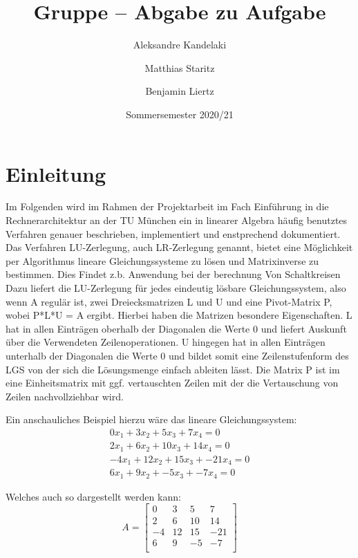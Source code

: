 \documentclass[course=erap]{aspdoc}
\author{⁨Aleksandre Kandelaki \and Matthias Staritz \and Benjamin Liertz}
\date{Sommersemester 2020/21} %
\title{Gruppe \theGroup{} -- Abgabe zu Aufgabe \theNumber}
\begin{document}
\maketitle

\section{Einleitung}


Im Folgenden wird im Rahmen der Projektarbeit im Fach Einführung
in die Rechnerarchitektur an der TU München ein in linearer Algebra häufig 
benutztes Verfahren genauer beschrieben, implementiert und enstprechend dokumentiert.\\

\noindent\hspace*{15mm}%
Das Verfahren LU-Zerlegung, auch LR-Zerlegung genannt,
 bietet eine Möglichkeit per Algorithmus lineare Gleichungssysteme zu lösen und Matrixinverse zu bestimmen. Dies Findet z.b. Anwendung bei der berechnung Von Schaltkreisen\cite{LUAnwendung}
Dazu liefert die LU-Zerlegung für jedes eindeutig
 lösbare Gleichungssystem, also wenn A regulär ist,
  zwei Dreiecksmatrizen L und U und eine Pivot-Matrix P,
   wobei P*L*U = A ergibt. Hierbei haben die Matrizen besondere 
   Eigenschaften. L hat in allen Einträgen oberhalb der Diagonalen die Werte 0 und liefert 
   Auskunft über die Verwendeten Zeilenoperationen. U hingegen hat in allen Einträgen unterhalb
    der Diagonalen die Werte 0 und bildet somit eine Zeilenstufenform des LGS von der sich die 
    Lösungsmenge einfach ableiten lässt. Die Matrix P ist im eine Einheitsmatrix mit ggf. 
    vertauschten Zeilen mit der die Vertauschung von Zeilen nachvollziehbar wird.
    

\noindent\hspace*{15mm}%
Ein anschauliches Beispiel hierzu wäre das lineare Gleichungssystem:
\begin{eqnarray}
0x_1 + 3x_2 + 5x_3 + 7x_4 = 0 \\
2x_1 + 6x_2 + 10x_3 + 14x_4 = 0\\
-4x_1 + 12x_2 + 15x_3 + -21x_4 = 0\\
6x_1 + 9x_2 + -5x_3 + -7x_4 = 0
\end{eqnarray}



\noindent\hspace*{15mm}%
Welches auch so dargestellt werden kann:
\begin{equation}
A = \begin{bmatrix}
 0	& 3	 & 5  & 7 \\
 2	& 6	 & 10 & 14 \\
-4	& 12 & 15 & -21\\
 6	& 9  & -5 & -7\\
 \end{bmatrix}
\end{equation}
\end{document}
